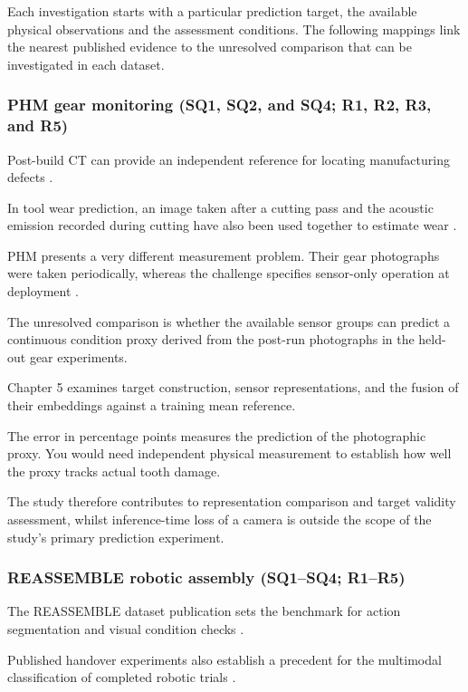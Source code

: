 Each investigation starts with a particular prediction target, the available physical observations
and the assessment conditions. The following mappings link the nearest published evidence to the
unresolved comparison that can be investigated in each dataset.

\subsubsection*{PHM gear monitoring (SQ1, SQ2, and SQ4; R1, R2, R3, and R5)}

Post-build CT can provide an independent reference for locating manufacturing defects
\parencite{Petrich2021Multimodal}.

In tool wear prediction, an image taken after a cutting pass and the acoustic emission recorded
during cutting have also been used together to estimate wear \parencite[PDF pp.~19--24]{P045}.

PHM presents a very different measurement problem. Their gear photographs were taken periodically,
whereas the challenge specifies sensor-only operation at deployment \parencite{PHM2026Challenge}.

The unresolved comparison is whether the available sensor groups can predict a continuous condition
proxy derived from the post-run photographs in the held-out gear experiments.

Chapter 5 examines target construction, sensor representations, and the fusion of their embeddings
against a training mean reference.

The error in percentage points measures the prediction of the photographic proxy. You would need
independent physical measurement to establish how well the proxy tracks actual tooth damage.

The study therefore contributes to representation comparison and target validity assessment, whilst
inference-time loss of a camera is outside the scope of the study's primary prediction experiment.

\subsubsection*{REASSEMBLE robotic assembly (SQ1--SQ4; R1--R5)}

The REASSEMBLE dataset publication sets the benchmark for action segmentation and visual condition
checks \parencite[PDF pp.~10--13]{Sliwowski2025REASSEMBLE}.

Published handover experiments also establish a precedent for the multimodal classification of
completed robotic trials \parencite[Table~III]{Thoduka2024Handover}.

